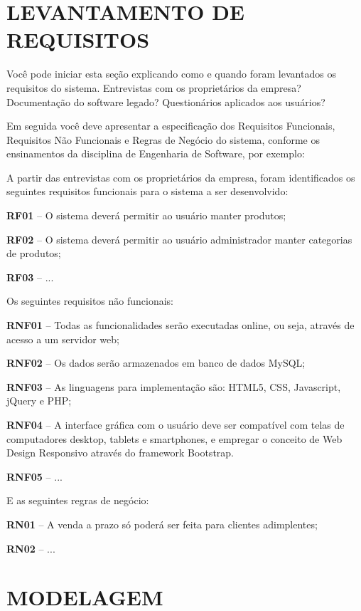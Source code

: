 \section{LEVANTAMENTO DE REQUISITOS} \label{sec:requisitos}

Você pode iniciar esta seção explicando como e quando foram levantados os requisitos do sistema. Entrevistas com os proprietários da empresa? Documentação do software legado? Questionários aplicados aos usuários?

Em seguida você deve apresentar a especificação dos Requisitos Funcionais, Requisitos Não Funcionais e Regras de Negócio do sistema, conforme os ensinamentos da disciplina de Engenharia de Software, por exemplo:

A partir das entrevistas com os proprietários da empresa, foram identificados os seguintes requisitos funcionais para o sistema a ser desenvolvido:

\textbf{RF01} – O sistema deverá permitir ao usuário manter produtos;

\textbf{RF02} – O sistema deverá permitir ao usuário administrador manter categorias de produtos;

\textbf{RF03} – ...

Os seguintes requisitos não funcionais:

\textbf{RNF01} – Todas as funcionalidades serão executadas online, ou seja, através de acesso a um servidor web;

\textbf{RNF02} – Os dados serão armazenados em banco de dados MySQL;

\textbf{RNF03} – As linguagens para implementação são: HTML5, CSS, Javascript, jQuery e PHP;

\textbf{RNF04} – A interface gráfica com o usuário deve ser compatível com telas de computadores desktop, tablets e smartphones, e empregar o conceito de Web Design Responsivo através do framework Bootstrap.

\textbf{RNF05} – ...

E as seguintes regras de negócio:

\textbf{RN01} – A venda a prazo só poderá ser feita para clientes adimplentes;

\textbf{RN02} – ...

\section{MODELAGEM}


